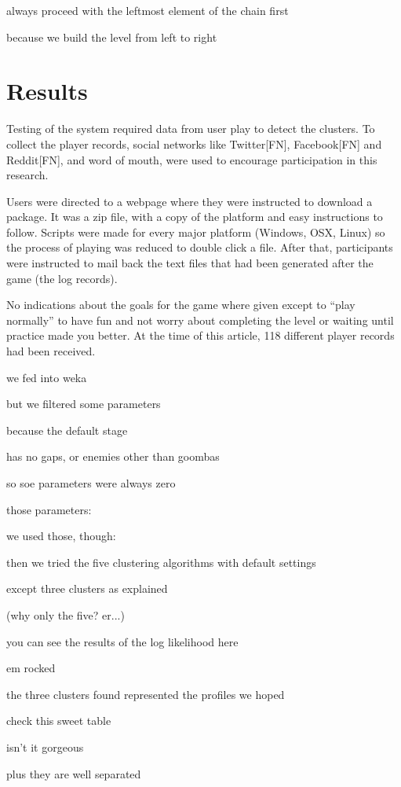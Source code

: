 \documentclass[conference]{IEEEtran}
\begin{document}
always proceed with the leftmost element of the chain first

because we build the level from left to right

\section{Results}

Testing of the system required data from user play to detect the clusters. To collect the player records, social networks like Twitter[FN], Facebook[FN] and Reddit[FN], and word of mouth, were used to encourage participation in this research.

Users were directed to a webpage where they were instructed to download a package. It was a zip file, with a copy of the platform and easy instructions to follow. Scripts were made for every major platform (Windows, OSX, Linux) so the process of playing was reduced to double click a file. After that, participants were instructed to mail back the text files that had been generated after the game (the log records).

No indications about the goals for the game where given except to ``play normally'' to have fun and not worry about completing the level or waiting until practice made you better. At the time of this article, 118 different player records had been received.


we fed into weka 

but we filtered some parameters

because the default stage

has no gaps, or enemies other than goombas

so soe parameters were always zero

those parameters:

we used those, though:

then we tried the five clustering algorithms with default settings

except three clusters as explained

(why only the five? er...)

you can see the results of the log likelihood here

em rocked

the three clusters found represented the profiles we hoped

check this sweet table

isn't it gorgeous

plus they are well separated
\end{document}
